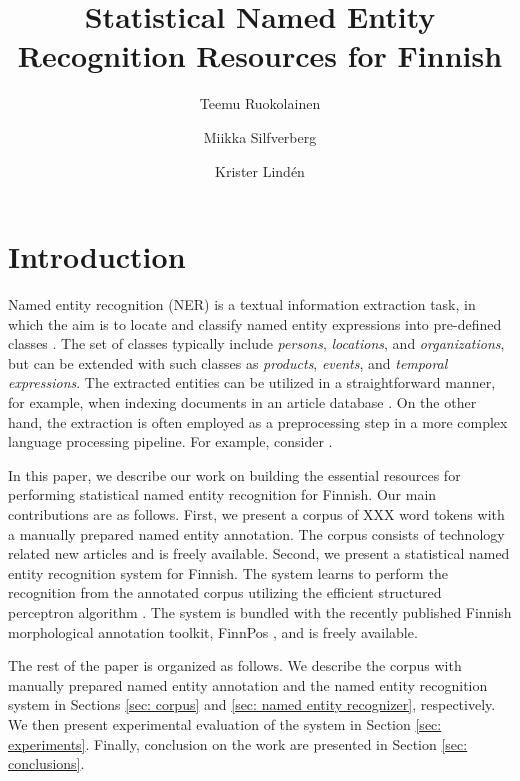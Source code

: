 \documentclass[11pt]{article}
\begin{document}
\title{Statistical Named Entity Recognition Resources for Finnish}
\author{Teemu Ruokolainen \and Miikka Silfverberg \and Krister Lind\'en}



\maketitle


\begin{abstract}
\noindent 

\end{abstract}

\section{Introduction}
\label{sec: introduction}

Named entity recognition (NER) is a textual information extraction task, in which the aim is to locate and classify named entity expressions into pre-defined classes \citep{}. The set of classes typically include \textit{persons}, \textit{locations}, and \textit{organizations}, but can be extended with such classes as \textit{products}, \textit{events}, and \textit{temporal expressions}. The extracted entities can be utilized in a straightforward manner, for example, when indexing documents in an article database \citep{}. On the other hand, the extraction is often employed as a preprocessing step in a more complex language processing pipeline. For example, consider .

In this paper, we describe our work on building the essential resources for performing statistical named entity recognition for Finnish. Our main contributions are as follows. First, we present a corpus of XXX word tokens with a manually prepared named entity annotation. The corpus consists of technology related new articles and is freely available. Second, we present a statistical named entity recognition system for Finnish. The system learns to perform the recognition from the annotated corpus utilizing the efficient structured perceptron algorithm \citep{collins2002}. The system is bundled with the recently published Finnish morphological annotation toolkit, FinnPos \citep{silfverberg2016}, and is freely available.

The rest of the paper is organized as follows. We describe the corpus with manually prepared named entity annotation and the named entity recognition system in Sections \ref{sec: corpus} and \ref{sec: named entity recognizer}, respectively.
We then present experimental evaluation of the system in Section \ref{sec: experiments}. Finally, conclusion on the work are presented in Section \ref{sec: conclusions}.
\end{document}
